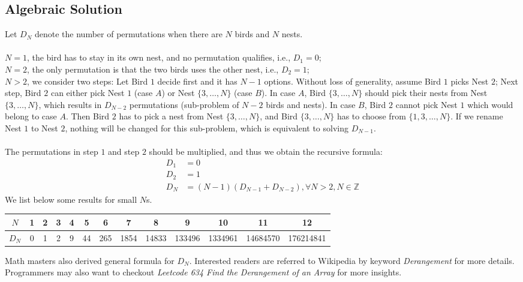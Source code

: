 \documentclass[12pt]{article}
\begin{document}
\subsection{Algebraic Solution}
Let $D_N$ denote the number of permutations when there are $N$ birds and $N$ nests. \\ \\
$N = 1$, the bird has to stay in its own nest, and no permutation qualifies, i.e., $D_1 = 0$; \\
$N = 2$, the only permutation is that the two birds uses the other nest, i.e., $D_2 = 1$; \\
$N > 2$, we consider two steps: Let Bird $1$ decide first and it has $N-1$ options. Without loss of generality, assume Bird $1$ picks Nest $2$; Next step, Bird $2$ can either pick Nest $1$ (case $A$) or Nest $\{3,\dots,N\}$ (case $B$). In case $A$, Bird $\{3,\dots,N\}$ should pick their nests from Nest $\{3,\dots,N\}$, which results in $D_{N-2}$ permutations (sub-problem of $N-2$ birds and nests). In case $B$, Bird $2$ cannot pick Nest $1$ which would belong to case $A$. Then Bird $2$ has to pick a nest from Nest $\{3,\dots,N\}$, and Bird $\{3,\dots,N\}$ has to choose from $\{1,3,\dots,N\}$. If we rename Nest $1$ to Nest $2$, nothing will be changed for this sub-problem, which is equivalent to solving $D_{N-1}$. \\ \\
The permutations in step $1$ and step $2$ should be multiplied, and thus we obtain the recursive formula:
\begin{align*}
	D_1   & = 0                                                                                      \\
	D_2   & = 1                                                                                      \\
	D_{N} & = \left( N - 1 \right) \left( D_{N-1} + D_{N-2} \right), \forall N > 2, N \in \mathbb{Z}
\end{align*}
We list below some results for small $N$s.
\begin{center}
	\begin{tabular}{|c| c c c c c c c c c c c c|}
		\hline
		$N$   & 1 & 2 & 3 & 4 & 5  & 6   & 7    & 8     & 9      & 10      & 11       & 12        \\
		\hline
		$D_N$ & 0 & 1 & 2 & 9 & 44 & 265 & 1854 & 14833 & 133496 & 1334961 & 14684570 & 176214841 \\
		\hline
	\end{tabular}
\end{center}
Math masters also derived general formula for $D_N$. Interested readers are referred to Wikipedia by keyword \textit{Derangement} for more details. Programmers may also want to checkout \textit{Leetcode 634 Find the Derangement of an Array} for more insights.
\end{document}
